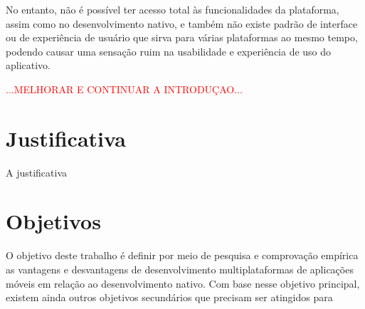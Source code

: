 No entanto, não é possível ter acesso total às funcionalidades da plataforma, assim como no desenvolvimento nativo, e também não existe padrão de interface ou de experiência de usuário que sirva
para várias plataformas ao mesmo tempo, podendo causar uma sensação ruim na usabilidade e experiência de uso do aplicativo.

\textcolor{red}{...MELHORAR E CONTINUAR A INTRODUÇAO...}

\section{Justificativa}\label{sec:justificativa}

A justificativa

\section{Objetivos} \label{sec:objetivos}
O objetivo deste trabalho é definir por meio de pesquisa e comprovação empírica as vantagens e desvantagens de desenvolvimento multiplataformas de aplicações móveis em relação ao desenvolvimento nativo. 
Com base nesse objetivo principal, existem ainda outros objetivos secundários que precisam ser atingidos para 

